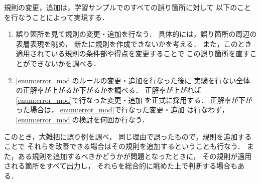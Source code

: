     規則の変更，追加は，学習サンプルでのすべての誤り箇所に対して
    以下のことを行なうことによって実現する．
    \begin{enumerate}
    \item 
      \label{enum:error_mod}
      誤り箇所を見て規則の変更・追加を行なう．
      具体的には，誤り箇所の周辺の表層表現を眺め，
      新たに規則を作成できないかを考える．
      また，このとき適用されている規則の条件部や得点を変更することで
      この誤り箇所を直すことができないかを調べる．

    \item 
      \ref{enum:error_mod}のルールの変更・追加を行なった後に
      実験を行ない全体の正解率が上がるか下がるかを調べる．
      正解率が上がれば\ref{enum:error_mod}で行なった変更・追加
      を正式に採用する．
      正解率が下がった場合は，\ref{enum:error_mod}で行なった変更・追加
      は行なわず，
      \ref{enum:error_mod}の検討を何回か行なう．
    \end{enumerate}
    
    このとき，大雑把に誤り例を調べ，
    同じ理由で誤ったもので，規則を追加することで
    それらを改善できる場合はその規則を追加するということも行なう．
    また，ある規則を追加するべきかどうかが問題となったときに，
    その規則が適用される箇所をすべて出力し，
    それらを総合的に眺めた上で判断する場合もある．

